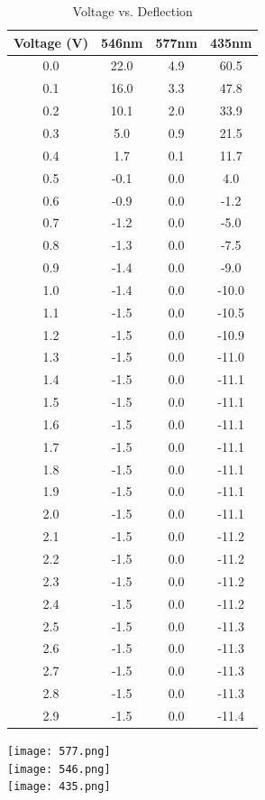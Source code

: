 \documentclass{amsart}
\begin{document}
\begin{table}[H]
    \begin{minipage}{.45\textwidth}
\centering
\caption{Voltage vs. Deflection}
\bigskip \bigskip
\label{my-label}
\begin{tabular}{c|c|c|c}
Voltage (V) & 546nm & 577nm & 435nm \\ \hline
0.0         & 22.0  & 4.9   & 60.5  \\
0.1         & 16.0  & 3.3   & 47.8  \\
0.2         & 10.1  & 2.0   & 33.9  \\
0.3         & 5.0   & 0.9   & 21.5  \\
0.4         & 1.7   & 0.1   & 11.7  \\
0.5         & -0.1  & 0.0   & 4.0   \\
0.6         & -0.9  & 0.0   & -1.2  \\
0.7         & -1.2  & 0.0   & -5.0  \\
0.8         & -1.3  & 0.0   & -7.5  \\
0.9         & -1.4  & 0.0   & -9.0  \\
1.0         & -1.4  & 0.0   & -10.0 \\
1.1         & -1.5  & 0.0   & -10.5 \\
1.2         & -1.5  & 0.0   & -10.9 \\
1.3         & -1.5  & 0.0   & -11.0 \\
1.4         & -1.5  & 0.0   & -11.1 \\
1.5         & -1.5  & 0.0   & -11.1 \\
1.6         & -1.5  & 0.0   & -11.1 \\
1.7         & -1.5  & 0.0   & -11.1 \\
1.8         & -1.5  & 0.0   & -11.1 \\
1.9         & -1.5  & 0.0   & -11.1 \\
2.0         & -1.5  & 0.0   & -11.1 \\
2.1         & -1.5  & 0.0   & -11.2 \\
2.2         & -1.5  & 0.0   & -11.2 \\
2.3         & -1.5  & 0.0   & -11.2 \\
2.4         & -1.5  & 0.0   & -11.2 \\
2.5         & -1.5  & 0.0   & -11.3 \\
2.6         & -1.5  & 0.0   & -11.3 \\
2.7         & -1.5  & 0.0   & -11.3 \\
2.8         & -1.5  & 0.0   & -11.3 \\
2.9         & -1.5  & 0.0   & -11.4
\end{tabular}
\end{minipage}
%
\begin{minipage}{.5\textwidth}
    \centering
    \texttt{[image: 577.png]}\\
    \texttt{[image: 546.png]}\\
    \texttt{[image: 435.png]}
\end{minipage}
\end{table}
\end{document}
